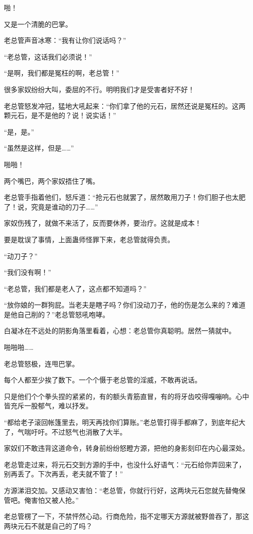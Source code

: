 \begin{this_body}
啪！

又是一个清脆的巴掌。

老总管声音冰寒：“我有让你们说话吗？”

“老总管，这话我们必须说！”

“是啊，我们都是冤枉的啊，老总管！”

很多家奴纷纷大叫，委屈的不行。明明我们才是受害者好不好！

老总管怒发冲冠，猛地大吼起来：“你们拿了他的元石，居然还说是冤枉的。这两颗元石，是不是他的？说！说实话！”

“是，是。”

“虽然是这样，但是……”

啪啪！

两个嘴巴，两个家奴捂住了嘴。

老总管手指着他们，怒斥道：“抢元石也就罢了，居然敢用刀子！你们胆子也太肥了！说，究竟是谁动的刀子……”

家奴伤残了，就做不来活了，反而要休养，要治疗。这就是成本！

要是耽误了事情，上面蛊师怪罪下来，老总管就得负责。

“动刀子？”

“我们没有啊！”

“老总管，我们都是老人了，这点都不知道吗？”

“放你娘的一群狗屁。当老夫是瞎子吗？你们没动刀子，他的伤是怎么来的？难道是他自己削的？”老总管怒吼咆哮。

白凝冰在不远处的阴影角落里看着，心想：老总管你真聪明。居然一猜就中。

啪啪啪……

老总管怒极，连甩巴掌。

每个人都至少挨了数下。一个个慑于老总管的淫威，不敢再说话。

只是他们个个拳头捏的紧紧的，有的额头青筋直冒，有的将牙齿咬得嘎嘣响。心中皆充斥一股郁气，难以抒发。

“都给老子滚回帐篷里去，明天再找你们算账。”老总管打得手都麻了，到底年纪大了，气喘吁吁。不过怒气也消散了大半。

家奴们不敢违背这道命令，转身前纷纷怒瞪方源，把他的身影刻印在内心最深处。

老总管走过来，将元石交到方源的手中，也没什么好语气：“元石给你弄回来了，别再丢了。下次再丢，老夫就不管了！”

方源涕泪交加。又感动又害怕：“老总管，你就行行好，这两块元石您就先替俺保管吧。俺害怕又被人抢。”

老总管楞了一下，不禁怦然心动。行商危险，指不定哪天方源就被野兽吞了，那这两块元石不就是自己的了吗？


\end{this_body}
